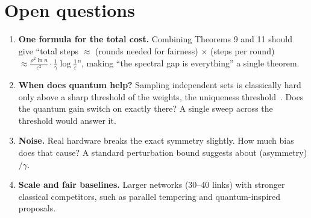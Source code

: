 \documentclass[11pt,a4paper]{article}
\begin{document}
\section{Open questions}

\begin{enumerate}[leftmargin=*]
\item \textbf{One formula for the total cost.} Combining Theorems 9 and 11 should give ``total steps
$\approx$ (rounds needed for fairness) $\times$ (steps per round) $\approx \frac{\rho^2\ln n}{\varepsilon^2}\cdot\frac1\gamma\log\frac1\varepsilon$'',
making ``the spectral gap is everything'' a single theorem.
\item \textbf{When does quantum help?} Sampling independent sets is classically hard only above a sharp
threshold of the weights, the uniqueness threshold~\cite{sly}. Does the quantum gain switch on exactly
there? A single sweep across the threshold would answer it.
\item \textbf{Noise.} Real hardware breaks the exact symmetry slightly. How much bias does that cause? A
standard perturbation bound suggests about (asymmetry)$/\gamma$.
\item \textbf{Scale and fair baselines.} Larger networks (30--40 links) with stronger classical
competitors, such as parallel tempering and quantum-inspired proposals.
\end{enumerate}

\end{document}
